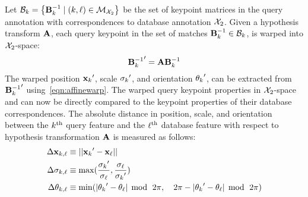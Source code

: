             Let $\mathcal{B}_{k} = \left\{{\mathbf{B}^{-1}_{k}} \mid (k, \ell) \in \mathcal{M}_{\mathcal{X}_{2}}\right\}$ be the set of
            keypoint matrices in the query annotation with correspondences to database annotation $\mathcal{X}_{2}$. Given
            a hypothesis transform $\mathbf{A}$, each query keypoint in the set of matches
            ${\mathbf{B}^{-1}_{k}} \in \mathcal{B}_{k}$, is warped into $\mathcal{X}_{2}$-space:
            \begin{equation}
                {{\ensuremath{\mathbf{B}}^{-1}_{k}}}' = \mathbf{A} {\mathbf{B}^{-1}_{k}}
            \end{equation}
            The warped position ${{\mathbf{x}_{k}}}'$, scale ${{\sigma_{k}}}'$, and orientation ${{\theta_{k}}}'$, can be
            extracted from ${{\mathbf{B}^{-1}_{k}}}'$ using~\cref{eqn:affinewarp}. The warped query keypoint properties in
            $\mathcal{X}_{2}$-space and can now be directly compared to the keypoint properties of their database
            correspondences.
            The absolute distance in position, scale, and orientation between the $k^{\textrm{th}}{}$ query feature and
            the $\ell^{\textrm{th}}{}$ database feature with respect to hypothesis transformation $\mathbf{A}$ is measured as
            follows:
            \begin{equation}\label{eqn:inlierdelta}
                \begin{aligned}
                    \Delta \mathbf{x}_{k, \ell}     & \equiv  ||{{\mathbf{x}_{k}}}' - {\mathbf{x}_{\ell}}||_{}\\
                    \Delta \sigma_{k, \ell}  & \equiv  \max(
                        \frac{{{\sigma_{k}}}'}{{\sigma_{\ell}}},
                        \frac{{\sigma_{\ell}}}{{{\sigma_{k}}}'}) \\
                    \Delta \theta_{k, \ell}    & \equiv  \min(
                        |{{\theta_{k}}}' - {\theta_{\ell}}|\; \operatorname{mod}{} \;\,2\pi,\quad 
                        2\pi - |{{\theta_{k}}}' - {\theta_{\ell}}|\; \operatorname{mod}{} \;\,2\pi)
                \end{aligned}
            \end{equation}

